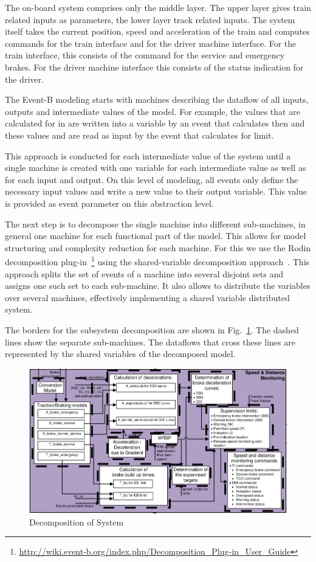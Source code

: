 \documentclass{template/openetcs_article}
\begin{document}
The on-board system comprises only the middle layer. The upper layer gives train
related inputs as parameters, the lower layer track related inputs. The system
itself takes the current position, speed and acceleration of the train and
computes commands for the train interface and for the driver machine
interface. For the train interface, this consists of the command for the service
and emergency brakes. For the driver machine interface this consists of the
status indication for the driver.

The Event-B modeling starts with machines describing the dataflow of all inputs,
outputs and intermediate values of the model. For example, the values that are
calculated for  in 
are written into a variable by an event that calculates then and these values
and are read as input by the event that calculates  for 
limit.

This approach is conducted for each intermediate value of the system until a
single machine is created with one variable for each intermediate value as well
as for each input and output. On this level of modeling, all events only define
the necessary input values and write a new value to their output variable. This
value is provided as event parameter on this abstraction level.

The next step is to decompose the single machine into different sub-machines, in
general one machine for each functional part of the model. This allows for model
structuring and complexity reduction for each machine. For this we use the Rodin
decomposition
plug-in~\footnote{\url{http://wiki.event-b.org/index.php/Decomposition_Plug-in_User_Guide}}
using the shared-variable decomposition
approach~\cite{silva2011decomposition}. This approach splits the set of events
of a machine into several disjoint sets and assigns one such set to each
sub-machine. It also allows to distribute the variables over several machines,
effectively implementing a shared variable distributed system.

The borders for the subsystem decomposition are shown in
Fig.~\ref{fig:system-decomposition}. The dashed lines show the separate
sub-machines. The dataflows that cross these lines are represented by the shared
variables of the decomposed model.

\begin{figure}[ht]
  \centering
  \includegraphics[width=.66\textwidth]{OverviewSelected}
  \caption{Decomposition of System}
  \label{fig:system-decomposition}
\end{figure}
\end{document}
